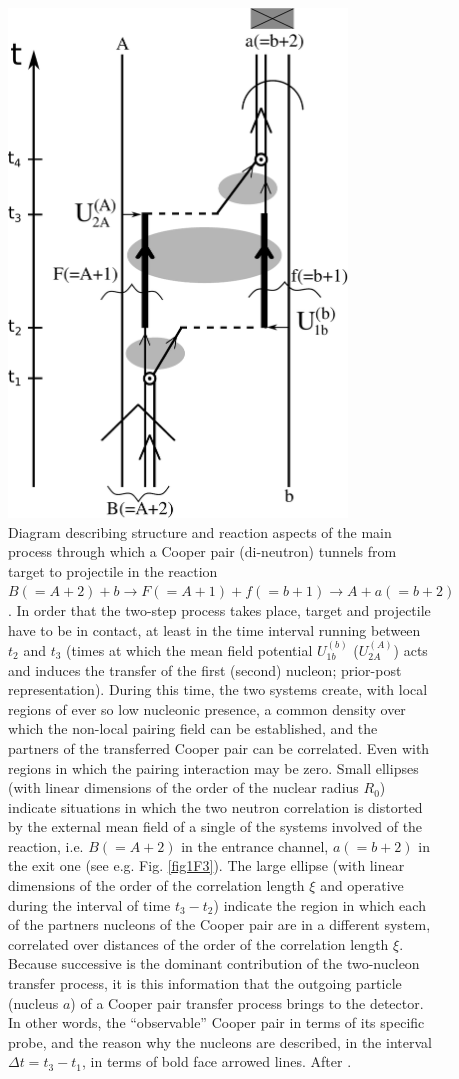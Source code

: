     \begin{figure}
    \centerline{\includegraphics*[width=9cm,angle=0]{C8/figsC8/Fig8_v2}}
    	\caption{Diagram describing structure and reaction aspects of the main process through which a Cooper pair (di-neutron) tunnels from target to projectile in the reaction $B(=A+2)+b\to F(=A+1)+f(=b+1)\to A+a(=b+2)$. In order that the two-step process  takes place, target and projectile have to be in contact, at least in the time interval running between $t_2$ and $t_3$ (times at which the mean field potential $U_{1b}^{(b)}$ ($U_{2A}^{(A)}$) acts and induces the transfer of the first (second) nucleon; prior-post representation). During this time, the two systems create, with local regions of ever so low nucleonic presence, a common density over which the non-local pairing field can be established, and the partners of the transferred Cooper pair can be correlated. Even with regions in which the pairing interaction may be zero. Small ellipses (with linear dimensions of the order of the nuclear radius $R_0$) indicate situations in which the two neutron correlation is distorted by the external mean field of a single of the systems involved of the reaction, i.e. $B(=A+2)$ in the entrance channel, $a(=b+2)$ in the exit one (see e.g. Fig. \ref{fig1F3}). The large ellipse (with linear dimensions of the order of the correlation length $\xi$ and operative during the interval of time $t_3-t_2$) indicate the region in which each of the partners nucleons  of the Cooper pair are in a different system, correlated over distances of the order of the correlation length $\xi$. Because successive is the dominant contribution of the two-nucleon transfer process,  it is this information that the outgoing particle (nucleus $a$) of a Cooper pair transfer process brings to the detector. In other words, the ``observable'' Cooper pair in terms of its specific probe, and the reason why the nucleons are described, in the interval $\Delta t=t_3-t_1$, in terms of bold face arrowed lines. After \cite{Barranco:19b}.}\label{fig6.5.5}
    \end{figure}
